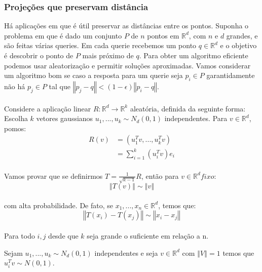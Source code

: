 \subsubsection{Projeções que preservam distância} Há aplicações em que é útil preservar as distâncias entre os pontos. Suponha o problema em que é dado um conjunto $P$ de $n$ pontos em $\mathbb{R}^d$, com $n$ e $d$ grandes, e são feitas várias queries. Em cada querie recebemos um ponto $q \in \mathbb{R}^d$ e o objetivo é descobrir o ponto de $P$ mais próximo de $q$. Para obter um algoritmo eficiente podemos usar aleatorização e permitir soluções aproximadas. Vamos considerar um algoritmo bom se caso a resposta para um querie seja $p_i \in P$ garantidamente não há $p_j \in P$ tal que $\left\Vert p_j - q \right\Vert <(1 - \epsilon) \left\Vert p_i - q \right\Vert$. 

\paragraph{}Considere a aplicação linear $R \colon \mathbb{R}^d \to \mathbb{R}^k$ aleatória, definida da seguinte forma: Escolha $k$ vetores gaussianos $u_1,...,u_k \sim N_d(0,1)$ independentes. Para $v \in \mathbb{R}^d$, pomos:
\begin{equation*}
    \begin{split}
    R(v) &= (u_1^Tv,...,u_k^Tv)\\
         &= \sum\limits_{i=1}^k (u_i^Tv)e_i
    \end{split}
\end{equation*}
\paragraph{}Vamos provar que se definirmos $T = \frac{1}{\sqrt{k-1}}R$, então para $v \in \mathbb{R}^d fixo$:
\begin{equation*}
    \left\Vert T(v) \right\Vert \sim \left\Vert v \right\Vert
\end{equation*}
\paragraph{}com alta probabilidade. De fato, se $x_1,...,x_n\in \mathbb{R}^d$, temos que:
\begin{equation*}
    \left\Vert T(x_i) - T(x_j) \right\Vert \sim \left\Vert x_i - x_j \right\Vert
\end{equation*}
\paragraph{}Para todo $i,j$ desde que $k$ seja grande o suficiente em relação a n.
\begin{fato}
Sejam $u_1,...,u_k \sim N_d(0,1)$ independentes e seja $v \in \mathbb{R}^d$ com $\left\Vert V \right\Vert = 1$ temos que $u_i^Tv \sim N(0,1)$.
\end{fato}
